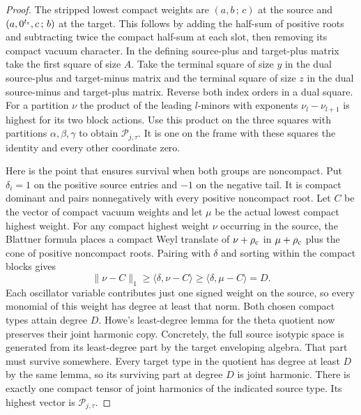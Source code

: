 \documentclass[a4paper,11pt]{article}
\theoremstyle{definition}
\theoremstyle{remark}
\numberwithin{equation}{section}
\begin{document}
\begin{proof}
The stripped lowest compact weights are \((a,b\,;\,c)\) at
the source and \((a,0^{t_{\rm r}},c\,;\,b)\) at the target.
This follows by adding the half-sum of positive roots and
subtracting twice the compact half-sum at each slot, then
removing its compact vacuum character. In the defining
source-plus and target-plus matrix take the first square
of size \(A\). Take the terminal square of size \(y\)
in the dual source-plus and target-minus matrix and the
terminal square of size \(z\) in the dual source-minus and
target-plus matrix. Reverse both index orders in a dual
square. For a partition \(\nu\) the product of the leading
\(l\)-minors with exponents \(\nu_l-\nu_{l+1}\) is highest
for its two block actions. Use this product on the three
squares with partitions \(\alpha,\beta,\gamma\) to obtain
\(\mathcal P_{j,\tau}\). It is one on the frame with these
squares the identity and every other coordinate zero.

Here is the point that ensures survival when both groups are
noncompact. Put \(\delta_i=1\) on the positive source entries
and \(-1\) on the negative tail. It is compact dominant and
pairs nonnegatively with every positive noncompact root.
Let \(C\) be the vector of compact vacuum weights and let
\(\mu\) be the actual lowest compact highest weight. For any
compact highest weight \(\nu\) occurring in the source, the
Blattner formula places a compact Weyl translate of
\(\nu+\rho_{\rm c}\) in \(\mu+\rho_{\rm c}\) plus the cone
of positive noncompact roots. Pairing with \(\delta\) and
sorting within the compact blocks gives
\[
 \|\nu-C\|_1\ge\langle\delta,\nu-C\rangle
                 \ge\langle\delta,\mu-C\rangle=D .
\]
Each oscillator variable contributes just one signed weight on
the source, so every monomial of this weight has degree at
least that norm. Both chosen compact types attain degree \(D\).
Howe's least-degree lemma for the theta quotient now preserves
their joint harmonic copy. Concretely, the full source isotypic
space is generated from its least-degree part by the target
enveloping algebra. That part must survive somewhere. Every
target type in the quotient has degree at least \(D\) by the
same lemma, so its surviving part at degree \(D\) is joint
harmonic. There is exactly one compact tensor of joint harmonics
of the indicated source type. Its highest vector is
\(\mathcal P_{j,\tau}\).


\end{proof}
\end{document}
